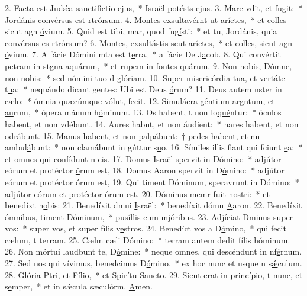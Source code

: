 2. Facta est Judǽa sanctifictio \uline{e}jus,~* Israël potésts \uline{e}jus.
3. Mare vdit, et f\uline{u}git:~* Jordánis convérsus est rtr\uline{ó}rsum.
4. Montes exsultavérnt ut ar\uline{í}etes,~* et colles sicut agn \uline{ó}vium.
5. Quid est tibi, mar, quod fug\uline{í}sti:~* et tu, Jordánis, quia convérsus es rtr\uline{ó}rsum?
6. Montes, exsultástis scut ar\uline{í}etes,~* et colles, sicut agn \uline{ó}vium.
7. A fácie Dómini mta est t\uline{e}rra,~* a fácie De J\uline{a}cob.
8. Qui convértit petram in stgna a\uline{quá}rum,~* et rupem in fontes \uline{quá}rum.
9. Non nobis, Dómne, non n\uline{o}bis:~* sed nómini tuo d gl\uline{ó}riam.
10. Super misericórdia tua, et vertáte t\uline{u}a:~* nequándo dicant gentes: Ubi est Deus \uline{ó}rum?
11. Deus autem nster in c\uline{æ}lo:~* ómnia quæcúmque vólut, f\uline{e}cit.
12. Simulácra géntium argntum, et \uline{au}rum,~* ópera mánum h\uline{ó}minum.
13. Os habent, t non lo\uline{qué}ntur:~* óculos habent, et non vd\uline{é}bunt.
14. Aures habnt, et non \uline{áu}dient:~* nares habent, et non odr\uline{á}bunt.
15. Manus habent, et non palpábunt:~† pedes habent, et nn ambul\uline{á}bunt:~* non clamábunt in gúttur s\uline{u}o.
16. Símiles illis fiant qui fciunt \uline{e}a:~* et omnes qui confídunt n \uline{e}is.
17. Domus Israël spervit in D\uline{ó}mino:~* adjútor eórum et protéctor \uline{ó}rum est,
18. Domus Aaron spervit in D\uline{ó}mino:~* adjútor eórum et protéctor \uline{ó}rum est,
19. Qui timent Dóminum, speravrunt in D\uline{ó}mino:~* adjútor eórum et protéctor \uline{ó}rum est.
20. Dóminus memr fuit n\uline{o}stri:~* et benedíxt n\uline{o}bis:
21. Benedíxit dmui \uline{I}sraël:~* benedíxit dómu \uline{A}aron.
22. Benedíxit ómnibus,  timent D\uline{ó}minum,~* pusíllis cum mj\uline{ó}ribus.
23. Adjíciat Dminus s\uline{u}per vos:~* super vos, et super fílis v\uline{e}stros.
24. Benedíct vos a D\uline{ó}mino,~* qui fecit cælum, t t\uline{e}rram.
25. Cælm cæli D\uline{ó}mino:~* terram autem dedit fílis h\uline{ó}minum.
26. Non mórtui laudbunt te, D\uline{ó}mine:~* neque omnes, qui descéndunt in nf\uline{é}rnum.
27. Sed nos qui vívimus, benedcimus D\uline{ó}mino,~* ex hoc nunc et usque n s\uline{ǽ}culum.
28. Glória Ptri, et F\uline{í}lio,~* et Spirítu S\uline{a}ncto.
29. Sicut erat in princípio, t nunc, et s\uline{e}mper,~* et in sǽcula sæculórm. \uline{A}men.
